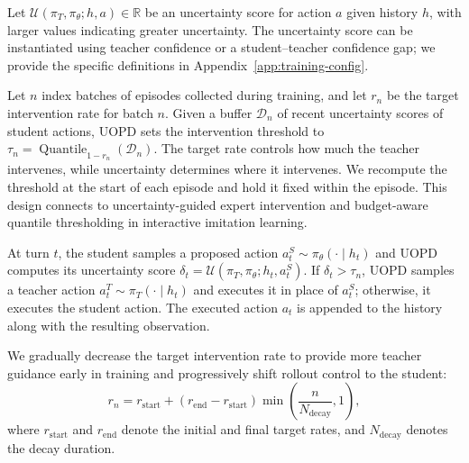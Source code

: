   Let $\mathcal U(\pi_T,\pi_\theta;h,a)\in\mathbb R$ be an uncertainty
  score for action $a$ given history $h$, with larger values indicating
  greater uncertainty. The uncertainty score can be instantiated using
  teacher confidence or a student--teacher confidence gap; we provide
  the specific definitions in Appendix~\ref{app:training-config}.

  Let $n$ index batches of episodes collected during training,
  and let $r_n$ be the target intervention rate for batch $n$.
  Given a buffer $\mathcal D_n$ of recent uncertainty scores of student
  actions, UOPD sets the intervention threshold to
  $\tau_n=\operatorname{Quantile}_{1-r_n}(\mathcal D_n)$.
  The target rate controls how much the teacher
  intervenes, while uncertainty determines where it intervenes.
  We recompute the threshold at the start of each episode and hold it
  fixed within the episode.
  This design connects to uncertainty-guided expert intervention
  \citep{menda2019ensembledagger} and budget-aware quantile thresholding
  \citep{hoque2022thriftydagger} in interactive imitation learning.

  At turn $t$, the student samples a proposed action
  $a_t^S\sim\pi_\theta(\cdot\mid h_t)$ and UOPD computes its uncertainty
  score $\delta_t=\mathcal U(\pi_T,\pi_\theta;h_t,a_t^S)$.
  If $\delta_t>\tau_n$, UOPD samples a teacher action
  $a_t^T\sim\pi_T(\cdot\mid h_t)$ and executes it in place of $a_t^S$;
  otherwise, it executes the student action. The executed action $a_t$
  is appended to the history along with the resulting observation.

  We gradually decrease the target intervention rate to provide more
  teacher guidance early in training and progressively shift rollout
  control to the student:
  \begin{equation}
  r_n=r_{\mathrm{start}}
  +(r_{\mathrm{end}}-r_{\mathrm{start}})
  \min\!\left(\frac{n}{N_{\mathrm{decay}}},1\right),
  \label{eq:intervention_schedule}
  \end{equation}
where $r_{\mathrm{start}}$ and $r_{\mathrm{end}}$ denote the initial and final target rates, and
  $N_{\mathrm{decay}}$ denotes the decay duration.
  

